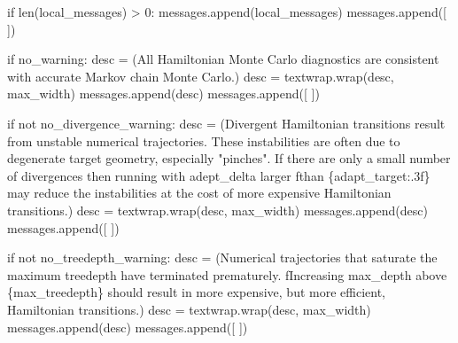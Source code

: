 \documentclass[
  letterpaper,
  DIV=11,
  numbers=noendperiod]{scrartcl}
\newenvironment{Shaded}{\begin{snugshade}}{\end{snugshade}}
\newcommand{\BuiltInTok}[1]{\textcolor[rgb]{0.00,0.23,0.31}{#1}}
\newcommand{\ControlFlowTok}[1]{\textcolor[rgb]{0.00,0.23,0.31}{#1}}
\newcommand{\DecValTok}[1]{\textcolor[rgb]{0.68,0.00,0.00}{#1}}
\newcommand{\KeywordTok}[1]{\textcolor[rgb]{0.00,0.23,0.31}{#1}}
\newcommand{\NormalTok}[1]{\textcolor[rgb]{0.00,0.23,0.31}{#1}}
\newcommand{\OperatorTok}[1]{\textcolor[rgb]{0.37,0.37,0.37}{#1}}
\newcommand{\SpecialCharTok}[1]{\textcolor[rgb]{0.37,0.37,0.37}{#1}}
\newcommand{\SpecialStringTok}[1]{\textcolor[rgb]{0.13,0.47,0.30}{#1}}
\newcommand{\StringTok}[1]{\textcolor[rgb]{0.13,0.47,0.30}{#1}}
\begin{document}
\begin{Shaded}
\begin{Highlighting}[]
    \ControlFlowTok{if} \BuiltInTok{len}\NormalTok{(local\_messages) }\OperatorTok{\textgreater{}} \DecValTok{0}\NormalTok{:}
\NormalTok{      messages.append(local\_messages)}
\NormalTok{      messages.append([}\StringTok{\textquotesingle{} \textquotesingle{}}\NormalTok{])}
  
  \ControlFlowTok{if}\NormalTok{ no\_warning:}
\NormalTok{    desc }\OperatorTok{=}\NormalTok{ (}\StringTok{\textquotesingle{}All Hamiltonian Monte Carlo diagnostics are consistent \textquotesingle{}}
            \StringTok{\textquotesingle{}with accurate Markov chain Monte Carlo.\textquotesingle{}}\NormalTok{)}
\NormalTok{    desc }\OperatorTok{=}\NormalTok{ textwrap.wrap(desc, max\_width)}
\NormalTok{    messages.append(desc)}
\NormalTok{    messages.append([}\StringTok{\textquotesingle{} \textquotesingle{}}\NormalTok{])}
  
  \ControlFlowTok{if} \KeywordTok{not}\NormalTok{ no\_divergence\_warning:}
\NormalTok{    desc }\OperatorTok{=}\NormalTok{ (}\StringTok{\textquotesingle{}Divergent Hamiltonian transitions result from \textquotesingle{}}
            \StringTok{\textquotesingle{}unstable numerical trajectories.  These \textquotesingle{}}
            \StringTok{\textquotesingle{}instabilities are often due to degenerate target \textquotesingle{}}
            \StringTok{\textquotesingle{}geometry, especially "pinches".  If there are \textquotesingle{}}
            \StringTok{\textquotesingle{}only a small number of divergences then running \textquotesingle{}}
            \StringTok{\textquotesingle{}with adept\_delta larger \textquotesingle{}}
            \SpecialStringTok{f\textquotesingle{}than }\SpecialCharTok{\{}\NormalTok{adapt\_target}\SpecialCharTok{:.3f\}}\SpecialStringTok{ may reduce the \textquotesingle{}}
            \StringTok{\textquotesingle{}instabilities at the cost of more expensive \textquotesingle{}}
            \StringTok{\textquotesingle{}Hamiltonian transitions.\textquotesingle{}}\NormalTok{)}
\NormalTok{    desc }\OperatorTok{=}\NormalTok{ textwrap.wrap(desc, max\_width)}
\NormalTok{    messages.append(desc)}
\NormalTok{    messages.append([}\StringTok{\textquotesingle{} \textquotesingle{}}\NormalTok{])}
  
  \ControlFlowTok{if} \KeywordTok{not}\NormalTok{ no\_treedepth\_warning:}
\NormalTok{    desc }\OperatorTok{=}\NormalTok{ (}\StringTok{\textquotesingle{}Numerical trajectories that saturate the \textquotesingle{}}
            \StringTok{\textquotesingle{}maximum treedepth have terminated prematurely.  \textquotesingle{}}
            \SpecialStringTok{f\textquotesingle{}Increasing max\_depth above }\SpecialCharTok{\{}\NormalTok{max\_treedepth}\SpecialCharTok{\}}\SpecialStringTok{ \textquotesingle{}}
            \StringTok{\textquotesingle{}should result in more expensive, but more \textquotesingle{}}
            \StringTok{\textquotesingle{}efficient, Hamiltonian transitions.\textquotesingle{}}\NormalTok{)}
\NormalTok{    desc }\OperatorTok{=}\NormalTok{ textwrap.wrap(desc, max\_width)}
\NormalTok{    messages.append(desc)}
\NormalTok{    messages.append([}\StringTok{\textquotesingle{} \textquotesingle{}}\NormalTok{])}
  

\end{Highlighting}
\end{Shaded}
\end{document}
